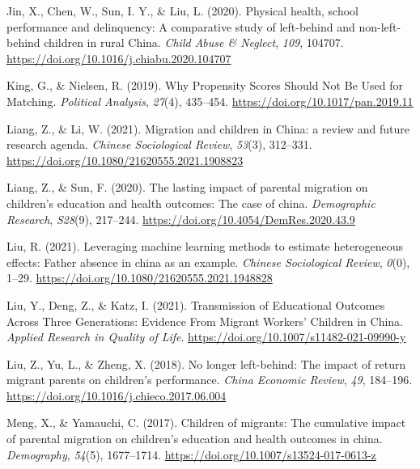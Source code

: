 \documentclass[
  man,floatsintext]{apa7}
\newlength{\cslhangindent}
\newlength{\cslentryspacingunit} %
\newenvironment{CSLReferences}[2] %
 {%
  \setlength{\parindent}{0pt}
  \ifodd #1
  \let\oldpar\par
  \def\par{\hangindent=\cslhangindent\oldpar}
  \fi
  \setlength{\parskip}{#2\cslentryspacingunit}
 }%
 {}
\begin{document}
\begin{CSLReferences}{1}{0}
\leavevmode{}%
Jin, X., Chen, W., Sun, I. Y., \& Liu, L. (2020). Physical health, school performance and delinquency: A comparative study of left-behind and non-left-behind children in rural China. \emph{Child Abuse \& Neglect}, \emph{109}, 104707. \url{https://doi.org/10.1016/j.chiabu.2020.104707}

\leavevmode{}%
King, G., \& Nielsen, R. (2019). Why Propensity Scores Should Not Be Used for Matching. \emph{Political Analysis}, \emph{27}(4), 435--454. \url{https://doi.org/10.1017/pan.2019.11}

\leavevmode{}%
Liang, Z., \& Li, W. (2021). Migration and children in China: a review and future research agenda. \emph{Chinese Sociological Review}, \emph{53}(3), 312--331. \url{https://doi.org/10.1080/21620555.2021.1908823}

\leavevmode{}%
Liang, Z., \& Sun, F. (2020). The lasting impact of parental migration on children's education and health outcomes: The case of china. \emph{Demographic Research}, \emph{S28}(9), 217--244. \url{https://doi.org/10.4054/DemRes.2020.43.9}

\leavevmode{}%
Liu, R. (2021). Leveraging machine learning methods to estimate heterogeneous effects: Father absence in china as an example. \emph{Chinese Sociological Review}, \emph{0}(0), 1--29. \url{https://doi.org/10.1080/21620555.2021.1948828}

\leavevmode{}%
Liu, Y., Deng, Z., \& Katz, I. (2021). Transmission of Educational Outcomes Across Three Generations: Evidence From Migrant Workers{'} Children in China. \emph{Applied Research in Quality of Life}. \url{https://doi.org/10.1007/s11482-021-09990-y}

\leavevmode{}%
Liu, Z., Yu, L., \& Zheng, X. (2018). No longer left-behind: The impact of return migrant parents on children's performance. \emph{China Economic Review}, \emph{49}, 184--196. \url{https://doi.org/10.1016/j.chieco.2017.06.004}

\leavevmode{}%
Meng, X., \& Yamauchi, C. (2017). Children of migrants: The cumulative impact of parental migration on children{'}s education and health outcomes in china. \emph{Demography}, \emph{54}(5), 1677--1714. \url{https://doi.org/10.1007/s13524-017-0613-z}


\end{CSLReferences}
\end{document}
